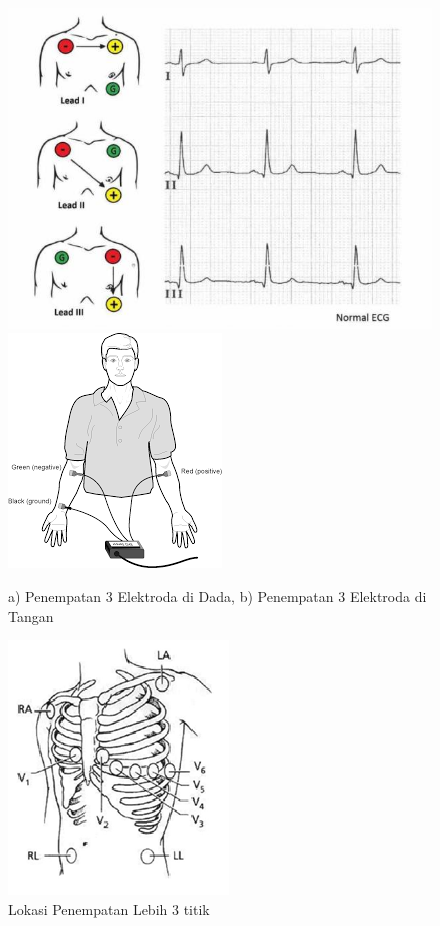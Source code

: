 \begin{figure}[H]
    \centering
    \includegraphics[scale=0.3]{images/3_ecg_place.jpg}
	\includegraphics[scale=0.6]{images/3_ecg_place_2.png}    
    \caption{a) Penempatan 3 Elektroda di Dada, b) Penempatan 3 Elektroda di Tangan}
    \label{fig:electrode3}
	\includegraphics[scale=0.8]{images/multi_ecg.png}
    \caption{Lokasi Penempatan Lebih 3 titik}
    \label{fig:multi_elctrode}
\end{figure}

